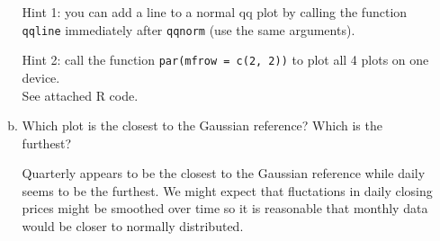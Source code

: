 \documentclass[letterpaper,12pt,fleqn]{article}
\begin{document}
\begin{enumerate}
\begin{enumerate}[a)]
Hint 1: you can add a line to a normal qq plot by calling the function \texttt{qqline} immediately after \texttt{qqnorm} (use the same arguments).

Hint 2: call the function \texttt{par(mfrow = c(2, 2))} to plot all 4 plots on one device. \\


See attached R code. \\


\item Which plot is the closest to the Gaussian reference? Which is the furthest?

Quarterly appears to be the closest to the Gaussian reference while daily seems to be the furthest. We might expect that fluctations in daily closing prices might be smoothed over time so it is reasonable that monthly data would be closer to normally distributed.

\end{enumerate}

\end{enumerate}
\end{document}
